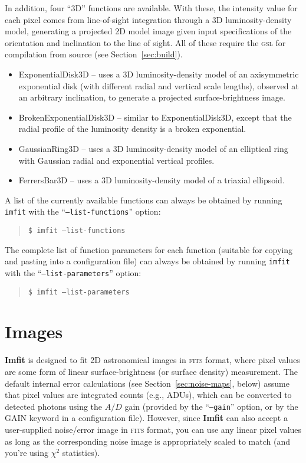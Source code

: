\documentclass[10pt,a4paper,article]{memoir}
\newcommand{\imfit}{\textbf{Imfit}}
\newcommand{\Imfit}{\textbf{Imfit}}
\newcommand{\imfitprog}{\texttt{imfit}}
\newcommand{\chisquare}{\ensuremath{\chi^{2}}}
\begin{document}
In addition, four ``3D'' functions are available. With these, the
intensity value for each pixel comes from line-of-sight integration
through a 3D luminosity-density model, generating a projected 2D model
image given input specifications of the orientation and inclination to
the line of sight. All of these require the \textsc{gsl} for compilation
from source (see Section~\ref{sec:build}).
\begin{itemize}
\item ExponentialDisk3D -- uses a 3D luminosity-density model of an axisymmetric 
exponential disk (with different radial and vertical scale lengths), observed
at an arbitrary inclination, to generate a projected surface-brightness image.
\item BrokenExponentialDisk3D -- similar to ExponentialDisk3D, except that the
radial profile of the luminosity density is a broken exponential.

\item GaussianRing3D -- uses a 3D luminosity-density model of an
elliptical ring with Gaussian radial and exponential vertical profiles.

\item FerrersBar3D -- uses a 3D luminosity-density model of a triaxial
\citet{ferrers} ellipsoid.

\end{itemize}

A list of the currently available functions can always be obtained
by running \imfitprog{} with the ``\texttt{--list-functions}'' option:
\begin{quote}
  \texttt{\$ \imfitprog{} --list-functions}
\end{quote}
The complete list of function parameters for each function (suitable for copying
and pasting into a configuration file) can always be
obtained by running \imfitprog{} with the ``\texttt{--list-parameters}'' option:
\begin{quote}
  \texttt{\$ \imfitprog{} --list-parameters}
\end{quote}




\newpage

\chapter{Images}

\Imfit{} is designed to fit 2D astronomical images in \textsc{fits}
format, where pixel values are some form of linear surface-brightness
(or surface density) measurement. The default internal error
calculations (see Section~\ref{sec:noise-maps}, below) assume that pixel
values are integrated counts (e.g., ADUs), which can be converted to
detected photons using the $A/D$ gain (provided by the 
``\texttt{--gain}'' option, or by the GAIN keyword in a configuration
file). However, since \imfit{} can also accept a user-supplied
noise/error image in \textsc{fits} format, you can use any linear pixel
values as long as the corresponding noise image is appropriately scaled
to match (and you're using \chisquare{} statistics).
\end{document}
